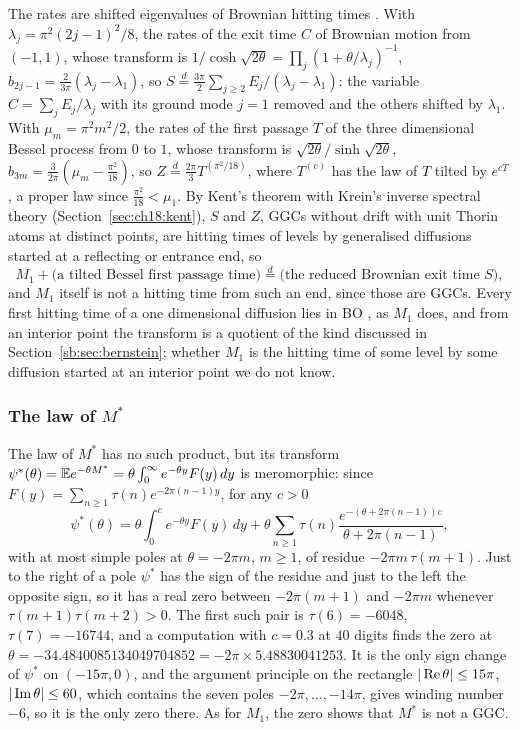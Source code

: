 The rates are shifted eigenvalues of Brownian hitting times \cite{BPY01}. With $\lambda_j=\pi^2(2j-1)^2/8$, the rates of the exit time $C$ of Brownian motion from $(-1,1)$, whose transform is $1/\cosh\sqrt{2\theta}=\prod_j(1+\theta/\lambda_j)^{-1}$, $b_{2j-1}=\frac2{3\pi}(\lambda_j-\lambda_1)$, so $S\overset d=\frac{3\pi}2\sum_{j\ge2}E_j/(\lambda_j-\lambda_1)$: the variable $C=\sum_jE_j/\lambda_j$ with its ground mode $j=1$ removed and the others shifted by $\lambda_1$. With $\mu_m=\pi^2m^2/2$, the rates of the first passage $T$ of the three dimensional Bessel process from $0$ to $1$, whose transform is $\sqrt{2\theta}/\sinh\sqrt{2\theta}$, $b_{3m}=\frac3{2\pi}(\mu_m-\frac{\pi^2}{18})$, so $Z\overset d=\frac{2\pi}3T^{(\pi^2/18)}$, where $T^{(c)}$ has the law of $T$ tilted by $e^{cT}$, a proper law since $\frac{\pi^2}{18}<\mu_1$. By Kent's theorem with Krein's inverse spectral theory (Section~\ref{sec:ch18:kent}), $S$ and $Z$, GGCs without drift with unit Thorin atoms at distinct points, are hitting times of levels by generalised diffusions started at a reflecting or entrance end, so
\[
M_1+\big(\text{a tilted Bessel first passage time}\big)\overset d=\big(\text{the reduced Brownian exit time }S\big),
\]
and $M_1$ itself is not a hitting time from such an end, since those are GGCs. Every first hitting time of a one dimensional diffusion lies in BO \cite{Kent82}, as $M_1$ does, and from an interior point the transform is a quotient of the kind discussed in Section~\ref{sb:sec:bernstein}; whether $M_1$ is the hitting time of some level by some diffusion started at an interior point we do not know.

\subsubsection{The law of \texorpdfstring{$M^*$}{M*}}\label{sec:maxexp:Mstar}

The law of $M^*$ has no such product, but its transform $\psi^*(\theta)=\mathbb{E} e^{-\theta M^*}=\theta\int_0^\infty e^{-\theta y}F(y)\,dy$ is meromorphic: since $F(y)=\sum_{n\ge1}\tau(n)e^{-2\pi(n-1)y}$, for any $c>0$
\[
\psi^*(\theta)=\theta\int_0^ce^{-\theta y}F(y)\,dy+\theta\sum_{n\ge1}\tau(n)\frac{e^{-(\theta+2\pi(n-1))c}}{\theta+2\pi(n-1)},
\]
with at most simple poles at $\theta=-2\pi m$, $m\ge1$, of residue $-2\pi m\,\tau(m+1)$. Just to the right of a pole $\psi^*$ has the sign of the residue and just to the left the opposite sign, so it has a real zero between $-2\pi(m+1)$ and $-2\pi m$ whenever $\tau(m+1)\tau(m+2)>0$. The first such pair is $\tau(6)=-6048$, $\tau(7)=-16744$, and a computation with $c=0.3$ at $40$ digits finds the zero at $\theta=-34.4840085134049704852=-2\pi\times5.48830041253$. It is the only sign change of $\psi^*$ on $(-15\pi,0)$, and the argument principle on the rectangle $|\operatorname{Re}\theta|\le15\pi$, $|\operatorname{Im}\theta|\le60$, which contains the seven poles $-2\pi,\dots,-14\pi$, gives winding number $-6$, so it is the only zero there. As for $M_1$, the zero shows that $M^*$ is not a GGC.

